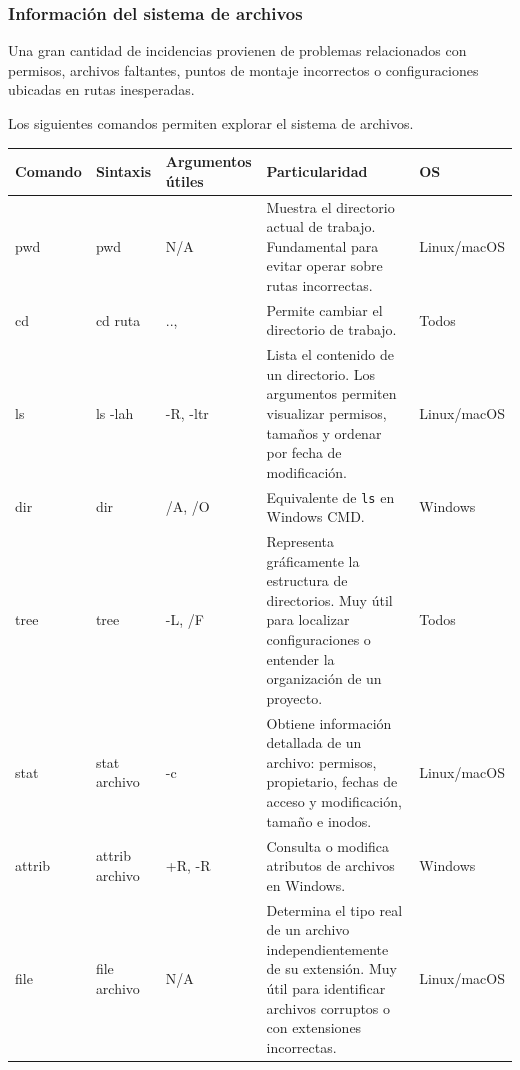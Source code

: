 \documentclass[a4paper,10pt]{article}
\begin{document}

\subsubsection{Información del sistema de archivos}

Una gran cantidad de incidencias provienen de problemas relacionados con
permisos, archivos faltantes, puntos de montaje incorrectos o configuraciones
ubicadas en rutas inesperadas.

Los siguientes comandos permiten explorar el sistema de archivos.

\begin{longtable}{|p{2.8cm}|p{3cm}|p{4cm}|p{5.6cm}|p{1.5cm}|}

\hline
Comando &
Sintaxis &
Argumentos útiles &
Particularidad &
OS
\\
\hline
\endhead

pwd &
pwd &
N/A &
Muestra el directorio actual de trabajo. Fundamental para evitar operar sobre rutas incorrectas. &
Linux/macOS
\\
\hline

cd &
cd ruta &
.., ~ &
Permite cambiar el directorio de trabajo. &
Todos
\\
\hline

ls &
ls -lah &
-R, -ltr &
Lista el contenido de un directorio. Los argumentos permiten visualizar permisos, tamaños y ordenar por fecha de modificación. &
Linux/macOS
\\
\hline

dir &
dir &
/A, /O &
Equivalente de \texttt{ls} en Windows CMD. &
Windows
\\
\hline

tree &
tree &
-L, /F &
Representa gráficamente la estructura de directorios. Muy útil para localizar configuraciones o entender la organización de un proyecto. &
Todos
\\
\hline

stat &
stat archivo &
-c &
Obtiene información detallada de un archivo: permisos, propietario, fechas de acceso y modificación, tamaño e inodos. &
Linux/macOS
\\
\hline

attrib &
attrib archivo &
+R, -R &
Consulta o modifica atributos de archivos en Windows. &
Windows
\\
\hline

file &
file archivo &
N/A &
Determina el tipo real de un archivo independientemente de su extensión. Muy útil para identificar archivos corruptos o con extensiones incorrectas. &
Linux/macOS
\\
\hline


\end{longtable}
\end{document}
